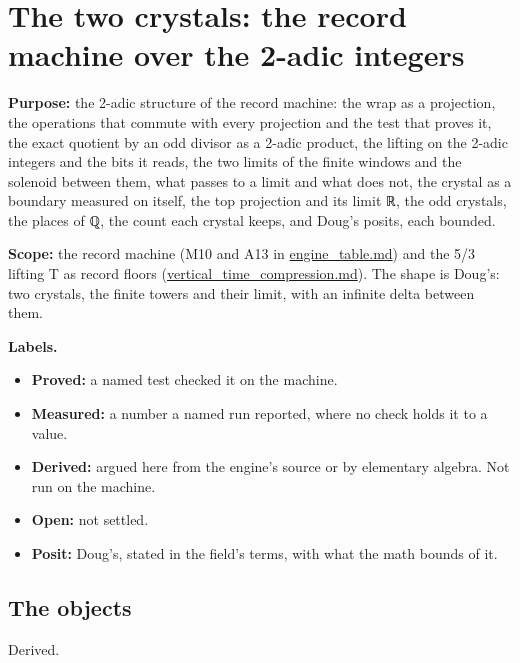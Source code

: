 \chapter{\texorpdfstring{The two crystals: the record machine over the 2-adic integers}{The two crystals: the record machine over the 2-adic integers}}
\label{chap:two-crystals}

\textbf{Purpose:} the 2-adic structure of the record machine: the wrap as a projection, the operations that commute with every projection and the test that proves it, the exact quotient by an odd divisor as a 2-adic product, the lifting on the 2-adic integers and the bits it reads, the two limits of the finite windows and the solenoid between them, what passes to a limit and what does not, the crystal as a boundary measured on itself, the top projection and its limit ℝ, the odd crystals, the places of ℚ, the count each crystal keeps, and Doug's posits, each bounded.

\textbf{Scope:} the record machine (M10 and A13 in \hyperref[chap:engine-table]{engine\_\allowbreak{}table.md}) and the 5/3 lifting T as record floors (\hyperref[chap:vertical-time-compression]{vertical\_\allowbreak{}time\_\allowbreak{}compression.md}). The shape is Doug's: two crystals, the finite towers and their limit, with an infinite delta between them.

\textbf{Labels.}

\begin{itemize}
\item \textbf{Proved:} a named test checked it on the machine.
\item \textbf{Measured:} a number a named run reported, where no check holds it to a value.
\item \textbf{Derived:} argued here from the engine's source or by elementary algebra. Not run on the machine.
\item \textbf{Open:} not settled.
\item \textbf{Posit:} Doug's, stated in the field's terms, with what the math bounds of it.
\end{itemize}

\section{\texorpdfstring{The objects}{The objects}}

Derived.

